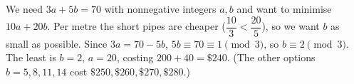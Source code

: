 We need $3a+5b=70$ with nonnegative integers $a,b$ and want to minimise $10a+20b$. Per metre the short pipes are cheaper ($\dfrac{10}{3}<\dfrac{20}{5}$), so we want $b$ as small as possible. Since $3a=70-5b$, $5b\equiv70\equiv1\pmod3$, so $b\equiv2\pmod3$. The least is $b=2$, $a=20$, costing $200+40=\boxed{\$240}$. (The other options $b=5,8,11,14$ cost $\$250,\$260,\$270,\$280$.)
